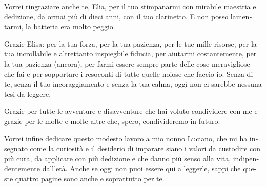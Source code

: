 \begin{otherlanguage}{italian}
Vorrei ringraziare anche te, Elia, per il tuo stimpanarmi con mirabile maestria e dedizione, da ormai più di dieci anni, con il tuo clarinetto. E non posso lamentarmi, la batteria era molto peggio.

Grazie Elisa: per la tua forza, per la tua pazienza, per le tue mille risorse, per la tua incrollabile e altrettanto inspiegbile fiducia, per aiutarmi costantemente, per la tua pazienza (ancora), per farmi essere sempre parte delle cose meravigliose che fai e per sopportare i resoconti di tutte quelle noiose che faccio io.
Senza di te, senza il tuo incoraggiamento e senza la tua calma, oggi non ci sarebbe nessuna tesi da leggere.

Grazie per tutte le avventure e disavventure che hai voluto condividere con me e grazie per le molte e molte altre che, spero, condivideremo in futuro.

Vorrei infine dedicare questo modesto lavoro a mio nonno Luciano, che mi ha insegnato come la curiosità e il desiderio di imparare siano i valori da custodire con più cura, da applicare con più dedizione e che danno più senso alla vita, indipendentemente dall'età. Anche se oggi non puoi essere qui a leggerle, sappi che queste quattro pagine sono anche e soprattutto per te.
\end{otherlanguage}